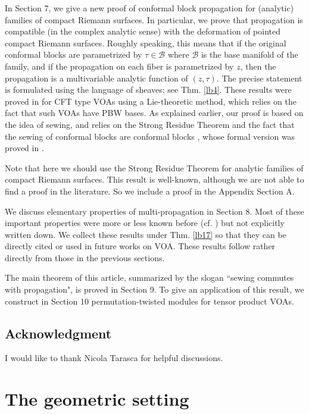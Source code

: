\documentclass[12pt,a4paper,notitlepage]{article}
\theoremstyle{definition}
\theoremstyle{plain}
\newcommand{\mc}{\mathcal}
\numberwithin{equation}{section}
\begin{document}
In Section 7, we give a new proof of conformal block propagation for (analytic) families of compact Riemann surfaces. In particular, we prove that propagation is compatible (in the complex analytic sense) with the deformation of pointed compact Riemann surfaces. Roughly speaking, this means that if the original conformal blocks are parametrized by $\tau\in\mc B$ where $\mc B$ is the base manifold of the family, and if the propagation on each fiber is parametrized by $z$, then the propagation is a multivariable analytic function of $(z,\tau)$. The precise statement is formulated using the language of sheaves; see Thm. \ref{lb4}. These results were proved in \cite[Thm. 3.6]{Cod19} for CFT type VOAs using a Lie-theoretic method, which relies on the fact that such VOAs have PBW bases. As explained earlier, our proof is based on the idea of sewing, and relies on the Strong Residue Theorem and the fact that the sewing of conformal blocks are conformal blocks \cite[Thm. 11.2]{Gui20}, whose  formal version was proved in \cite{DGT19b}. 

Note that here we should use the Strong Residue Theorem for analytic families of compact Riemann surfaces. This result is well-known, although we are not able to find a proof in the literature. So we include a proof in the Appendix Section A.

We discuss elementary properties of multi-propagation in Section 8.  Most of these important properties were more or less known before (cf. \cite{FB04}) but not explicitly written down. We collect these results under Thm. \ref{lb17} so that they can be directly cited or used in future works on VOA. These results follow rather directly from those in the previous sections.

The main theorem of this article, summarized by the slogan ``sewing commutes with propagation", is proved in Section 9. To give an application of this result, we construct in Section 10 permutation-twisted modules for tensor product VOAs.



\subsection*{Acknowledgment}

I would like to thank Nicola Tarasca for helpful discussions.





\section{The geometric setting}\label{lb2}
\end{document}

